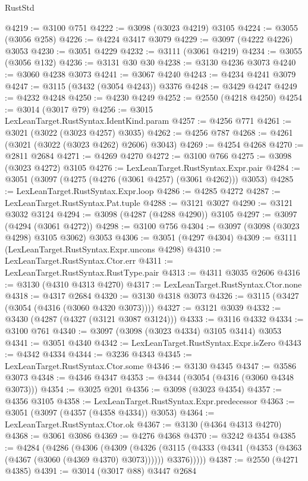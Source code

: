\begin{lexlean}{RustStd}
\begin{coremodule}
{\begin{coremodule}
{{{{{{{{{{{{{{{{{{{{{{{{{{{{{{{{@4219 := @3100 @751
@4222 := @3098 (@3023 @4219) @3105
@4224 := @3055 (@3056 @258)
@4226 := @4224 @3417 @3079
@4229 := @3097 (@4222 @4226) @3053
@4230 := @3051 @4229
@4232 := @3111 (@3061 @4219)
@4234 := @3055 (@3056 @132)
@4236 := @3131 @30 @30
@4238 := @3130 @4236 @3073
@4240 := @3060 @4238 @3073
@4241 := @3067 @4240
@4243 := @4234 @4241 @3079
@4247 := @3115 (@3432 (@3054 @4243)) @3376
@4248 := @3429 @4247
@4249 := @4232 @4248
@4250 := @4230 @4249
@4252 := @2550 (@4218 @4250)
@4254 := @3014 (@3017 @79)
@4256 := @3015 LexLeanTarget.RustSyntax.IdentKind.param
@4257 := @4256 @771
@4261 := @3021 (@3022 (@3023 @4257) @3035)
@4262 := @4256 @787
@4268 := @4261 (@3021 (@3022 (@3023 @4262) @2606) @3043)
@4269 := @4254 @4268
@4270 := @2811 @2684
@4271 := @4269 @4270
@4272 := @3100 @766
@4275 := @3098 (@3023 @4272) @3105
@4276 := LexLeanTarget.RustSyntax.Expr.pair
@4284 := @3051 (@3097 (@4275 (@4276 (@3061 @4257) (@3061 @4262))) @3053)
@4285 := LexLeanTarget.RustSyntax.Expr.loop
@4286 := @4285 @4272
@4287 := LexLeanTarget.RustSyntax.Pat.tuple
@4288 := @3121 @3027
@4290 := @3121 @3032 @3124
@4294 := @3098 (@4287 (@4288 @4290)) @3105
@4297 := @3097 (@4294 (@3061 @4272))
@4298 := @3100 @756
@4304 := @3097 (@3098 (@3023 @4298) @3105 @3062) @3053
@4306 := @3051 (@4297 @4304)
@4309 := @3111 (LexLeanTarget.RustSyntax.Expr.uncons @4298)
@4310 := LexLeanTarget.RustSyntax.Ctor.err
@4311 := LexLeanTarget.RustSyntax.RustType.pair
@4313 := @4311 @3035 @2606
@4316 := @3130 (@4310 @4313 @4270)
@4317 := LexLeanTarget.RustSyntax.Ctor.none
@4318 := @4317 @2684
@4320 := @3130 @4318 @3073
@4326 := @3115 (@3427 (@3054 (@4316 (@3060 @4320 @3073))))
@4327 := @3121 @3039
@4332 := @3430 (@4287 (@4327 (@3121 @3087 @3124)))
@4333 := @3116 @4332
@4334 := @3100 @761
@4340 := @3097 (@3098 (@3023 @4334) @3105 @3414) @3053
@4341 := @3051 @4340
@4342 := LexLeanTarget.RustSyntax.Expr.isZero
@4343 := @4342 @4334
@4344 := @3236 @4343
@4345 := LexLeanTarget.RustSyntax.Ctor.some
@4346 := @3130 @4345
@4347 := @3586 @3073
@4348 := @4346 @4347
@4353 := @4344 (@3054 (@4316 (@3060 @4348 @3073)))
@4354 := @3025 @201
@4356 := @3098 (@3023 @4354)
@4357 := @4356 @3105
@4358 := LexLeanTarget.RustSyntax.Expr.predecessor
@4363 := @3051 (@3097 (@4357 (@4358 @4334)) @3053)
@4364 := LexLeanTarget.RustSyntax.Ctor.ok
@4367 := @3130 (@4364 @4313 @4270)
@4368 := @3061 @3086
@4369 := @4276 @4368
@4370 := @3242 @4354
@4385 := @4284
    (@4286
      (@4306
        (@4309
          (@4326
            (@3115 (@4333 (@4341 (@4353 (@4363 (@4367 (@3060 (@4369 @4370) @3073)))))) @3376)))))
@4387 := @2550 (@4271 @4385)
@4391 := @3014 (@3017 @88) @3447 @2684
}}}}}}}}}}}}}}}}}}}}}}}}}}}}}}}}
\end{coremodule}}
\end{coremodule}
\end{lexlean}
